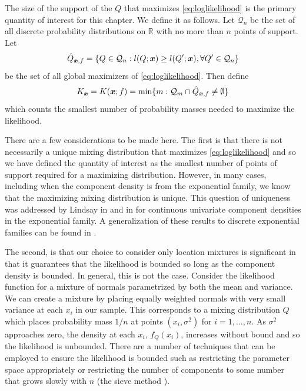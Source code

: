 	The size of the support of the $Q$ that maximizes \eqref{eq:loglikelihood} is the primary quantity of interest for this chapter. We define it as follows. Let $\mathcal{Q}_n$ be the set of all discrete probability distributions on $\mathbb{R}$ with no more than $n$ points of support. Let
	\begin{equation}
		\hat{Q}_{{\bm{{x}}},f} = \{Q \in \mathcal{Q}_n: l(Q;{\bm{{x}}}) \geq l(Q';{\bm{{x}}}), \forall Q' \in \mathcal{Q}_n\}
	\end{equation}
	be the set of all global maximizers of \eqref{eq:loglikelihood}. Then define
	\begin{equation}
		K_{\bm{{x}}} = K({\bm{{x}}}; f) = \min\{m : \mathcal{Q}_m \cap \hat{Q}_{{\bm{{x}}},f} \neq \emptyset\}
	\end{equation}
	which counts the smallest number of probability masses needed to maximize the likelihood.


	There are a few considerations to be made here. The first is that there is not necessarily a unique mixing distribution that maximizes \eqref{eq:loglikelihood} and so we have defined the quantity of interest as the smallest number of points of support required for a maximizing distribution. However, in many cases, including when the component density is from the exponential family, we know that the maximizing mixing distribution is unique. This question of uniqueness was addressed by Lindsay in \cite{Lindsay1983-tf} and in \cite{Lindsay1983a-he} for continuous univariate component densities in the exponential family. A generalization of these results to discrete exponential families can be found in \cite{Lindsay1993-rj}.

	The second, is that our choice to consider only location mixtures is significant in that it guarantees that the likelihood is bounded so long as the component density is bounded. In general, this is not the case. Consider the likelihood function for a mixture of normals parametrized by both the mean and variance. We can create a mixture by placing equally weighted normals with very small variance at each $x_i$ in our sample. This corresponds to a mixing distribution $Q$ which places probability mass $1/n$ at points $(x_i, \sigma^2)$ for $i = 1, \dots, n$. As $\sigma^2$ approaches zero, the density at each $x_i$, $f_Q(x_i)$, increases without bound and so the likelihood is unbounded. There are a number of techniques that can be employed to ensure the likelihood is bounded such as restricting the parameter space appropriately or restricting the number of components to some number that grows slowly with $n$ (the sieve method \cite{Grenander1981-dy}).


